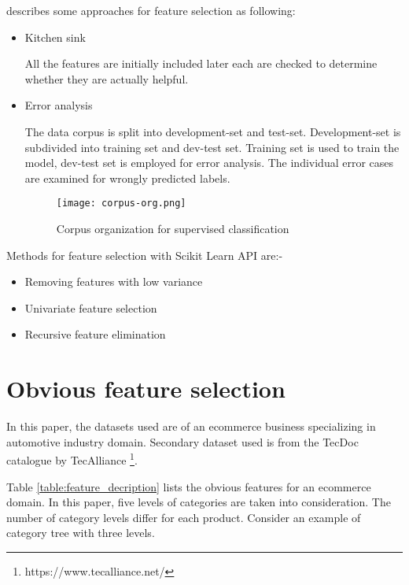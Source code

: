 \parencite{BirdKleinLoper09}  describes some approaches for feature selection as following:

\begin{itemize}
      \item Kitchen sink 
      

      All the features are initially included later each are checked to determine whether they are actually helpful.

      \item Error analysis
      
      The data corpus is split into development-set and test-set. Development-set is subdivided into training set and dev-test set. Training set is used to train the model, dev-test set is employed for error analysis.  The individual error cases are examined for wrongly predicted labels.
      
      
      \begin{figure}[H]
            \centering    
            \texttt{[image: corpus-org.png]}
            \caption{Corpus organization for supervised classification \parencite{BirdKleinLoper09}}
            \label{fig:corpus-supervised-classification}
        \end{figure}

\end{itemize}

 Methods for feature selection with Scikit Learn API are:-
\begin{itemize}
      \item Removing features with low variance
      \item Univariate feature selection
      \item Recursive feature elimination

\end{itemize}

\section{Obvious feature selection}

In this paper, the datasets used are of an ecommerce business specializing in automotive industry domain. Secondary dataset used is from the TecDoc catalogue by TecAlliance \footnote{https://www.tecalliance.net/}. 

Table \ref{table:feature_decription} lists the obvious features for an ecommerce domain. In this paper, five levels of categories are taken into consideration. The number of category levels differ for each product. Consider an example of category tree with three levels. 

